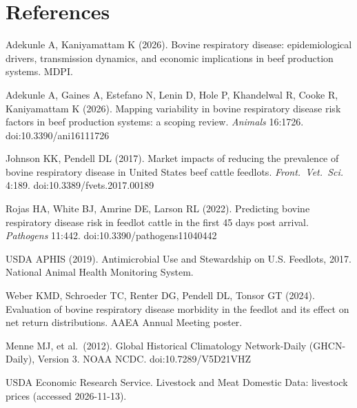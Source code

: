 \documentclass[10pt,letterpaper]{article}
\begin{document}
\section*{References}
\footnotesize
\begin{enumerate}[label={[\arabic*]},leftmargin=2em,itemsep=0pt]
  \item Adekunle A, Kaniyamattam K (2026). Bovine respiratory disease: epidemiological drivers, transmission dynamics, and economic implications in beef production systems. MDPI.
  \item Adekunle A, Gaines A, Estefano N, Lenin D, Hole P, Khandelwal R, Cooke R, Kaniyamattam K (2026). Mapping variability in bovine respiratory disease risk factors in beef production systems: a scoping review. \emph{Animals} 16:1726. doi:10.3390/ani16111726
  \item Johnson KK, Pendell DL (2017). Market impacts of reducing the prevalence of bovine respiratory disease in United States beef cattle feedlots. \emph{Front.\ Vet.\ Sci.} 4:189. doi:10.3389/fvets.2017.00189
  \item Rojas HA, White BJ, Amrine DE, Larson RL (2022). Predicting bovine respiratory disease risk in feedlot cattle in the first 45 days post arrival. \emph{Pathogens} 11:442. doi:10.3390/pathogens11040442
  \item USDA APHIS (2019). Antimicrobial Use and Stewardship on U.S. Feedlots, 2017. National Animal Health Monitoring System.
  \item Weber KMD, Schroeder TC, Renter DG, Pendell DL, Tonsor GT (2024). Evaluation of bovine respiratory disease morbidity in the feedlot and its effect on net return distributions. AAEA Annual Meeting poster.
  \item Menne MJ, et al.\ (2012). Global Historical Climatology Network-Daily (GHCN-Daily), Version 3. NOAA NCDC. doi:10.7289/V5D21VHZ
  \item USDA Economic Research Service. Livestock and Meat Domestic Data: livestock prices (accessed 2026-11-13).
\end{enumerate}
\end{document}
